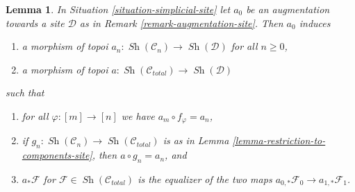 \documentclass{stacks-project}
\theoremstyle{plain}
\newtheorem{lemma}[subsection]{Lemma}
\theoremstyle{definition}
\theoremstyle{remark}
\numberwithin{equation}{subsection}
\def\Sh{\mathop{\mathit{Sh}}\nolimits}
\begin{document}
\begin{lemma}
\label{lemma-augmentation-site}
In Situation \ref{situation-simplicial-site} let $a_0$ be an
augmentation towards a site $\mathcal{D}$ as in
Remark \ref{remark-augmentation-site}. Then $a_0$ induces
\begin{enumerate}
\item a morphism of topoi $a_n : \Sh(\mathcal{C}_n) \to \Sh(\mathcal{D})$
for all $n \geq 0$,
\item a morphism of topoi $a : \Sh(\mathcal{C}_{total}) \to \Sh(\mathcal{D})$
\end{enumerate}
such that
\begin{enumerate}
\item for all $\varphi : [m] \to [n]$ we have $a_m \circ f_\varphi = a_n$,
\item if $g_n : \Sh(\mathcal{C}_n) \to \Sh(\mathcal{C}_{total})$
is as in Lemma \ref{lemma-restriction-to-components-site}, then
$a \circ g_n = a_n$, and
\item $a_*\mathcal{F}$ for $\mathcal{F} \in \Sh(\mathcal{C}_{total})$
is the equalizer of the two maps
$a_{0, *}\mathcal{F}_0 \to a_{1, *}\mathcal{F}_1$.
\end{enumerate}
\end{lemma}
\end{document}
